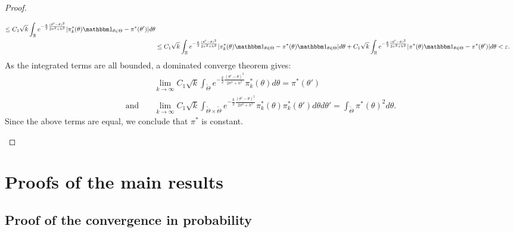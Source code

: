 \begin{proof}
\begin{enumerate}
\begin{equation}
\begin{aligned}
        \leq C_1\sqrt{k}\int_{\RR}e^{-\frac{k}{2}\frac{(\theta'-\theta)^2}{2\sigma^2+h^2}} |\pi^\ast_k(\theta)\indic_{\theta\in\Theta} - \pi^\ast(\theta') |d\theta \\
        &\leq  C_1\sqrt{k}\int_{\RR}e^{-\frac{k}{2}\frac{(\theta'-\theta)^2}{2\sigma^2+h^2}} |\pi^\ast_k(\theta)\indic_{\theta\in\Theta} - \pi^\ast(\theta)\indic_{\theta\in\Theta} |d\theta 
            + C_1\sqrt{k}\int_{\RR}e^{-\frac{k}{2}\frac{(\theta'-\theta)^2}{2\sigma^2+h^2}} |\pi^\ast(\theta)\indic_{\theta\in\Theta} - \pi^\ast(\theta') |d\theta <\eps.\\
        \end{aligned}
        \end{equation}
        As the integrated terms are all bounded, a dominated converge theorem gives:
        \begin{equation}
            \begin{aligned}
            &\lim_{k\rightarrow\infty}C_1\sqrt{k}\int_{\tilde\Theta} e^{-\frac{k}{2}\frac{(\theta'-\theta)^2}{2\sigma^2+h^2}} \pi_k^\ast(\theta)d\theta = \pi^\ast(\theta')\\
            \text{and}\quad&
            \lim_{k\rightarrow\infty} C_1\sqrt{k}\int_{\tilde\Theta\times\tilde\Theta} e^{-\frac{k}{2}\frac{(\theta'-\theta)^2}{2\sigma^2+h^2}} \pi_k^\ast(\theta)\pi_k^\ast(\theta')d\theta d\theta' = \int_{\tilde\Theta}\pi^\ast(\theta)^2d\theta.
            \end{aligned}
        \end{equation}
        Since the above terms are equal, we conclude that $\pi^\ast$ is constant.





 \end{enumerate}
\end{proof}


\section{Proofs of the main results}\label{sec:PSGSA:proofs}

\subsection{Proof of the convergence in probability}

